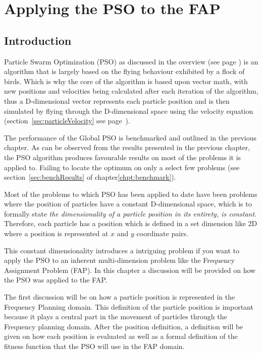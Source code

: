 \chapter{Applying the PSO to the FAP}
\label{chpt:psoapplicationFAP}
\section{Introduction}
Particle Swarm Optimization (PSO) as discussed in the overview (see page \pageref{sec:PSO}) is an algorithm that is largely based on the flying behaviour exhibited by a flock of birds. Which is why the core of the algorithm is based upon vector math, with new positions and velocities being calculated after each iteration of the algorithm, thus a D-dimensional vector represents each particle position and is then simulated by flying through the D-dimensional space using the velocity equation (section~\ref{sec:particleVelocity} see page~\pageref{eq:velocityupdate}).

The performance of the Global PSO is benchmarked and outlined in the previous chapter. As can be observed from the results presented in the previous chapter, the PSO algorithm produces favourable results on most of the problems it is applied to. Failing to locate the optimum on only a select few problems (see section~\ref{sec:benchResults} of chapter\ref{chpt:benchmark}). 

Most of the problems to which PSO has been applied to date have been problems where the position of particles have a constant D-dimensional space, which is to formally state \emph{the dimensionality of a particle position in its entirety, is constant}. Therefore, each particle has a position which is defined in a set dimension like 2D where a position is represented at $x$ and $y$ coordinate pairs.

This constant dimensionality introduces a intriguing problem if you want to apply the PSO to an inherent multi-dimension problem like the Frequency Assignment Problem (FAP). In this chapter a discussion will be provided on how the PSO was applied to the FAP.

The first discussion will be on how a particle position is represented in the Frequency Planning domain. This definition of the particle position is important because it plays a central part in
the movement of particles through the Frequency planning domain. After the position definition, a definition will be given on how each position is evaluated as well as a formal definition of the fitness function that the PSO will use in the FAP domain.


